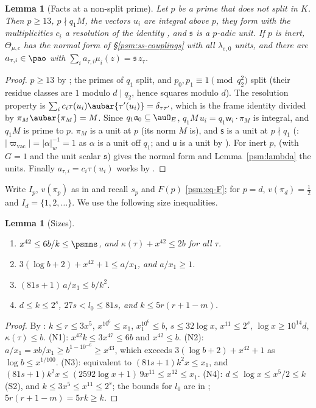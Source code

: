 \documentclass[10pt]{amsart}
\newtheorem{lemma}[theorem]{Lemma}
\theoremstyle{definition}
\theoremstyle{remark}
\begin{document}
\begin{lemma}[Facts at a non-split prime]\label{psm:nonsplit}
Let $p$ be a prime that does not split in $K$. Then $p\ge13$, $p\nmid q_1M$, the vectors $u_i$
are integral above $p$, they form with the multiplicities $c_i$ a resolution of the identity
{\cite[(30)]{P49}}, and $\mathfrak s$ is a $p$-adic unit. If $p$ is inert, $\Theta_{\mu,c}$ has the
normal form of \S\ref{psm:ss-couplings} with all $\lambda_{e,0}$ units, and there are
$a_{\tau,i}\in\pao$ with $\sum_ia_{\tau,i}\mu_i(z)=\mathfrak s\,z_\tau$.
\end{lemma}
\begin{proof}
$p\ge13$ by {\cite[(34)]{P46}}; the primes of $q_1$ split, and $p_0,p_1\equiv1\pmod{q_2^2}$ split
(their residue classes are $1$ modulo $d\mid q_2$, hence squares modulo $d$). The resolution property
is $\sum_ic_i\tau(u_i)\aubar{\tau'(u_i)}=\delta_{\tau\tau'}$, which is the frame identity divided by
$\pi_M\aubar{\pi_M}=M$. Since $q_1\mathfrak a_0\subseteq\auO_E$, $q_1M\,u_i=q_1\mathsf w_i\cdot
\pi_M$ is integral, and $q_1M$ is prime to $p$. $\pi_M$ is a unit at $p$ (its norm $M$ is), and
$\mathsf s$ is a unit at $p\nmid q_1$ ({\cite[Lemma~7.12]{P49}}: $|\varpi_{\mathrm{vac}}|=
|\alpha|_w^{-1}=1$ as $\alpha$ is a unit off $q_1$; and $\mathsf u$ is a unit by
{\cite[Corollary~7.3]{P49}}). For inert $p$, {\cite[Proposition~4.12]{P49}} (with $G=1$ and the unit scalar
$\mathfrak s$) gives the normal form and Lemma~\ref{psm:lambda} the units. Finally $a_{\tau,i}=c_i
\tau(u_i)$ works by {\cite[(30)]{P49}}.
\end{proof}

Write $I_p$, $v(\pi_p)$ as in {\cite[\S14.4]{P46}} and recall $s_p$ and $F(p)$
\eqref{psm:eq-F}; for $p=d$, $v(\pi_d)=\frac12$ and $I_d=\{1,2,\dots\}$. We use the following size
inequalities.

\begin{lemma}[Sizes]\label{psm:sizes}
\begin{enumerate}
\item[(N1)] $x^{42}\le6b/k\le\psmns$, and $\kappa(\tau)+x^{42}\le2b$ for all $\tau$.
\item[(N2)] $3(\log b+2)+x^{42}+1\le a/x_1$, and $a/x_1\ge1$.
\item[(N3)] $(81s+1)\,a/x_1\le b/k^2$.
\item[(N4)] $d\le k\le2^s$, $27s<l_0\le81s$, and $k\le5r(r+1-m)$.
\end{enumerate}
\end{lemma}
\begin{proof}
By {\cite[Lemma~13.4]{P46}}: $k\le r\le3x^5$, $x^{10^6}\le x_1$, $x_1^{10^6}\le b$, $s\le32\log x$,
$x^{11}\le2^s$, $\log x\ge10^{14}d$, $\kappa(\tau)\le b$. (N1): $x^{42}k\le3x^{47}\le6b$ and
$x^{42}\le b$. (N2): $a/x_1=xb/x_1\ge b^{1-10^{-6}}\ge x^{43}$, which exceeds
$3(\log b+2)+x^{42}+1$ as $\log b\le x^{1/100}$. (N3): equivalent to $(81s+1)k^2x\le x_1$, and
$(81s+1)k^2x\le(2592\log x+1)\,9x^{11}\le x^{12}\le x_1$. (N4): $d\le\log x\le x^5/2\le k$ (S2), and
$k\le3x^5\le x^{11}\le2^s$; the bounds for $l_0$ are in {\cite[\S13.1]{P46}}; $5r(r+1-m)=5rk\ge k$.
\end{proof}
\end{document}
